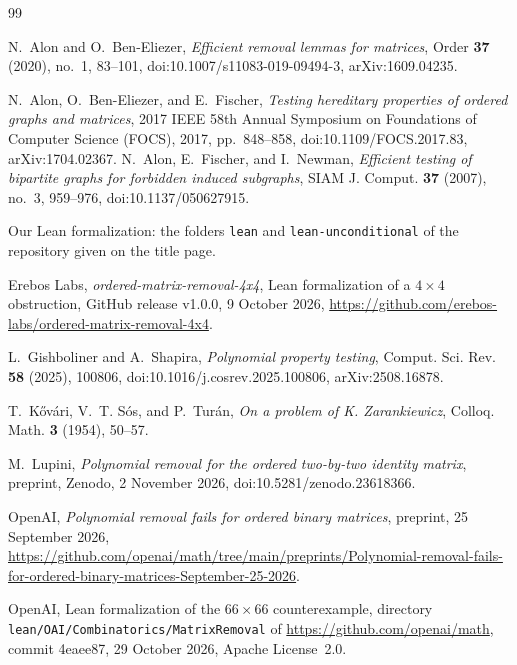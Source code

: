 \documentclass{article}
\theoremstyle{plain}
\theoremstyle{definition}
\begin{document}
 \begin{thebibliography}{99}
 \raggedright %
 
  N.~Alon and O.~Ben-Eliezer, \emph{Efficient removal lemmas for matrices},
  Order \textbf{37} (2020), no.~1, 83--101, doi:10.1007/s11083-019-09494-3, arXiv:1609.04235.
  
  N.~Alon, O.~Ben-Eliezer, and E.~Fischer, \emph{Testing hereditary properties of ordered graphs and matrices}, 2017 IEEE 58th Annual Symposium on Foundations of Computer Science (FOCS), 2017, pp.~848--858, doi:10.1109/FOCS.2017.83, arXiv:1704.02367.                                                                                             
  N.~Alon, E.~Fischer, and I.~Newman, \emph{Efficient testing of bipartite
  graphs for forbidden induced subgraphs}, SIAM J. Comput. \textbf{37} (2007),
  no.~3, 959--976, doi:10.1137/050627915.

  Our Lean formalization: the folders \texttt{lean} and \texttt{lean-unconditional} of the
  repository given on the title page.

  Erebos Labs, \emph{ordered-matrix-removal-4x4}, Lean formalization of a
  $4\times4$ obstruction, GitHub release v1.0.0, 9 October 2026,
  \url{https://github.com/erebos-labs/ordered-matrix-removal-4x4}.

  L.~Gishboliner and A.~Shapira, \emph{Polynomial property testing},
  Comput. Sci. Rev. \textbf{58} (2025), 100806,
  doi:10.1016/j.cosrev.2025.100806, arXiv:2508.16878.

  T.~K\H{o}v\'ari, V.~T. S\'os, and P.~Tur\'an, \emph{On a problem of K. Zarankiewicz},
  Colloq. Math. \textbf{3} (1954), 50--57.

  M.~Lupini, \emph{Polynomial removal for the ordered two-by-two identity matrix}, preprint,
  Zenodo, 2 November 2026, doi:10.5281/zenodo.23618366.


  OpenAI, \emph{Polynomial removal fails for ordered binary matrices},
  preprint, 25 September 2026,
  \url{https://github.com/openai/math/tree/main/preprints/Polynomial-removal-fails-for-ordered-binary-matrices-September-25-2026}.

  OpenAI, Lean formalization of the $66\times66$ counterexample, directory
  \texttt{lean/OAI/Combinatorics/MatrixRemoval} of \url{https://github.com/openai/math},
  commit 4eaee87, 29 October 2026, Apache License~2.0.


\end{thebibliography}
\end{document}
